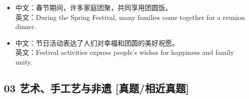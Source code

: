 \documentclass[a4paper,11pt,UTF8,fontset=none]{ctexart}
\begin{document}
\endgroup
\vspace{-2pt}

\par

\begin{itemize}[leftmargin=1.7em,itemsep=1pt,parsep=0pt,topsep=2pt]
\item \noindent 中文：春节期间，许多家庭团聚，共同享用团圆饭。\\ 英文：During the Spring Festival, many families come together for a reunion dinner.\par


\item \noindent 中文：节日活动表达了人们对幸福和团圆的美好祝愿。\\ 英文：Festival activities express people’s wishes for happiness and family unity.\par


\end{itemize}

\subsection{03 艺术、手工艺与非遗 {\color{AccentBlue} [真题/相近真题]}}
\end{document}
